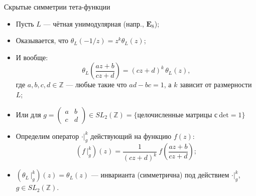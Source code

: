 \documentclass[serif, aspectratio=169]{beamer}
\begin{document}
\begin{frame}{Скрытые симметрии тета-функции}
    \begin{itemize}
        \item Пусть $L$ --- чётная унимодулярная (напр., $\mathbf{E}_8$);
        \item Оказывается, что $\theta_L(-1/z)=z^k\theta_L(z)$;
        \item И вообще:
        \[\theta_L\!\left(\frac{az+b}{cz+d}\right) = (cz+d)^{k}\,\theta_L(z),\]
        где $a,b,c,d\in\mathbb{Z}$ --- любые такие что $ad-bc=1$, а $k$ зависит от размерности $L$;
        \item Или для $g=\begin{pmatrix} a & b \\ c & d\end{pmatrix} \in SL_2(\mathbb{Z})=\{\text{целочисленные матрицы с}\ \mathrm{det} = 1\}$
        \item Определим оператор $\cdot |_g^k$ действующий на функцию $f(z)$:
        \[(f\,|_g^k)(z) = \frac{1}{(cz+d)^k}\ f\left(\frac{az+b}{cz+d}\right);\]
        \item $(\theta_L\,|_g^k)(z)=\theta_L(z)$ --- инварианта (симметрична) под действием $\cdot |_g^k$, $g\in SL_2(\mathbb{Z})$.     
    \end{itemize}
\end{frame}
\end{document}
